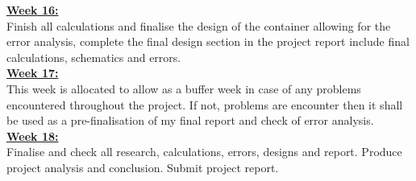 \textbf{\underline{Week 16:}} \\ [0.2cm]
Finish all calculations and finalise the design of the container allowing for the error analysis, complete the final design section in the project report include final calculations, schematics and errors.\\

\textbf{\underline{Week 17:}} \\ [0.2cm]
This week is allocated to allow as a buffer week in case of any problems encountered throughout the project. If not, problems are encounter then it shall be used as a pre-finalisation of my final report and check of error analysis.\\

\textbf{\underline{Week 18:}} \\ [0.2cm]
Finalise and check all research, calculations, errors, designs and report. Produce project analysis and conclusion. Submit project report.\\

